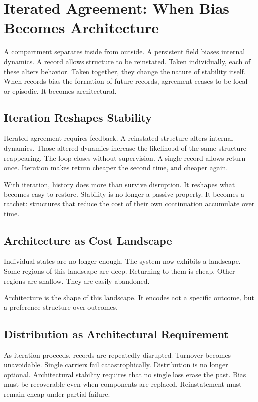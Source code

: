 \documentclass[11pt,twoside,openright]{book}
\begin{document}
\chapter{Iterated Agreement: When Bias Becomes Architecture}

A compartment separates inside from outside. A persistent field biases internal dynamics. A record allows structure to be reinstated. Taken individually, each of these alters behavior. Taken together, they change the nature of stability itself. When records bias the formation of future records, agreement ceases to be local or episodic. It becomes architectural.

\section*{Iteration Reshapes Stability}

Iterated agreement requires feedback. A reinstated structure alters internal dynamics. Those altered dynamics increase the likelihood of the same structure reappearing. The loop closes without supervision. A single record allows return once. Iteration makes return cheaper the second time, and cheaper again.

With iteration, history does more than survive disruption. It reshapes what becomes easy to restore. Stability is no longer a passive property. It becomes a ratchet: structures that reduce the cost of their own continuation accumulate over time.

\section*{Architecture as Cost Landscape}

Individual states are no longer enough. The system now exhibits a landscape. Some regions of this landscape are deep. Returning to them is cheap. Other regions are shallow. They are easily abandoned.

Architecture is the shape of this landscape. It encodes not a specific outcome, but a preference structure over outcomes.

\section*{Distribution as Architectural Requirement}

As iteration proceeds, records are repeatedly disrupted. Turnover becomes unavoidable. Single carriers fail catastrophically. Distribution is no longer optional. Architectural stability requires that no single loss erase the past. Bias must be recoverable even when components are replaced. Reinstatement must remain cheap under partial failure.
\end{document}
